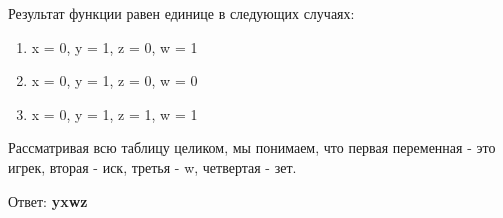 \documentclass[11pt]{article} %
\begin{document}
\vspace{2mm}

Результат функции равен единице в следующих случаях:

\begin{enumerate}
	\item x = 0, y = 1, z = 0, w = 1
	\item x = 0, y = 1, z = 0, w = 0
	\item x = 0, y = 1, z = 1, w = 1
\end{enumerate}

Рассматривая всю таблицу целиком, мы понимаем, что первая переменная - это игрек, вторая - иск, третья - w, четвертая - зет.

Ответ: \textbf{yxwz}
\end{document}
